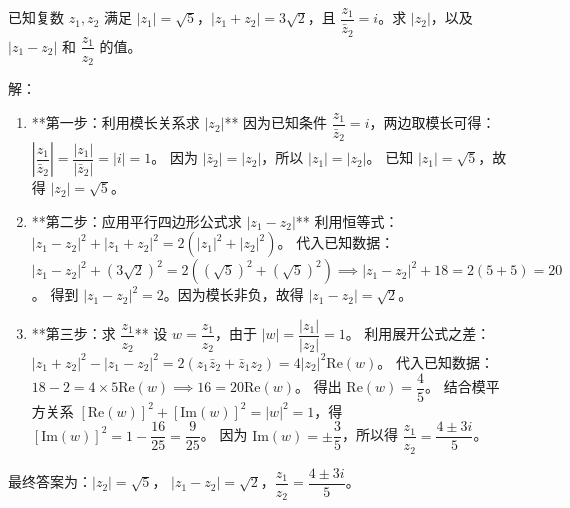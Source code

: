\documentclass{exam-zh}
\newcounter{solstep}
\begin{document}

\begin{problem}[points=15]
  已知复数 $z_1, z_2$ 满足 $|z_1| = \sqrt{5}$，$|z_1 + z_2| = 3\sqrt{2}$，且 $\dfrac{z_1}{\bar{z}_2} = i$。求 $|z_2|$，以及 $|z_1 - z_2|$ 和 $\dfrac{z_1}{z_2}$ 的值。
  \setcounter{solstep}{0}
  \begin{solutionblock}
    解：
\begin{enumerate}
  \item **第一步：利用模长关系求 $|z_2|$**
  因为已知条件 $\dfrac{z_1}{\bar{z}_2} = i$，两边取模长可得：
  $\left|\dfrac{z_1}{\bar{z}_2}\right| = \dfrac{|z_1|}{|\bar{z}_2|} = |i| = 1$。
  因为 $|\bar{z}_2| = |z_2|$，所以 $|z_1| = |z_2|$。
  已知 $|z_1| = \sqrt{5}$，故得 $|z_2| = \sqrt{5}$。
  
  \item **第二步：应用平行四边形公式求 $|z_1 - z_2|$**
  利用恒等式：$|z_1 - z_2|^2 + |z_1 + z_2|^2 = 2(|z_1|^2 + |z_2|^2)$。
  代入已知数据：$|z_1 - z_2|^2 + (3\sqrt{2})^2 = 2((\sqrt{5})^2 + (\sqrt{5})^2) \implies |z_1 - z_2|^2 + 18 = 2(5 + 5) = 20$。
  得到 $|z_1 - z_2|^2 = 2$。因为模长非负，故得 $|z_1 - z_2| = \sqrt{2}$。
  
  \item **第三步：求 $\dfrac{z_1}{z_2}$**
  设 $w = \dfrac{z_1}{z_2}$，由于 $|w| = \dfrac{|z_1|}{|z_2|} = 1$。
  利用展开公式之差：$|z_1 + z_2|^2 - |z_1 - z_2|^2 = 2(z_1\bar{z}_2 + \bar{z}_1z_2) = 4|z_2|^2\mathrm{Re}(w)$。
  代入已知数据：$18 - 2 = 4 \times 5 \mathrm{Re}(w) \implies 16 = 20 \mathrm{Re}(w)$。
  得出 $\mathrm{Re}(w) = \dfrac{4}{5}$。
  结合模平方关系 $[\mathrm{Re}(w)]^2 + [\mathrm{Im}(w)]^2 = |w|^2 = 1$，得 $[\mathrm{Im}(w)]^2 = 1 - \dfrac{16}{25} = \dfrac{9}{25}$。
  因为 $\mathrm{Im}(w) = \pm\dfrac{3}{5}$，所以得 $\dfrac{z_1}{z_2} = \dfrac{4 \pm 3i}{5}$。
\end{enumerate}
最终答案为：$|z_2| = \sqrt{5}$， $|z_1 - z_2| = \sqrt{2}$，$\dfrac{z_1}{z_2} = \dfrac{4 \pm 3i}{5}$。
  \end{solutionblock}
\end{problem}
\end{document}
